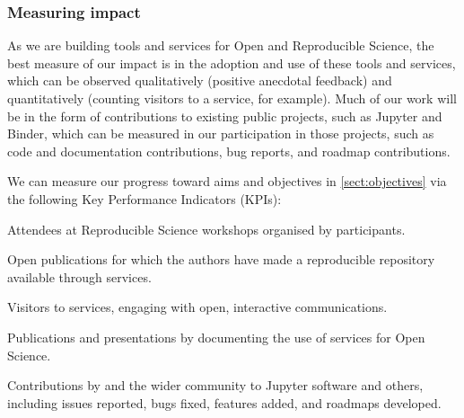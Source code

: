 \subsubsection{Measuring impact}

As we are building tools and services for Open and Reproducible Science,
the best measure of our impact is in the adoption and use of these tools and services,
which can be observed qualitatively (positive anecdotal feedback) and quantitatively
(counting visitors to a service, for example).
Much of our work will be in the form of contributions to existing public projects,
such as Jupyter and Binder,
which can be measured in our participation in those projects,
such as code and documentation contributions,
bug reports, and roadmap contributions.

We can measure our progress toward aims and objectives in \ref{sect:objectives}
via the following
Key Performance Indicators (KPIs):

\begin{compactenum}
  \item \label{kpi:workshop-attendees}
    Attendees at Reproducible Science workshops organised by \TheProject participants.
  \item \label{kpi:binder-publications}
    Open publications for which the authors have made a reproducible repository available
    through \TheProject services.
  \item \label{kpi:binder-visits}
    Visitors to \TheProject services, engaging with open, interactive
    communications.
  \item \label{kpi:dissemination}
    Publications and presentations by \TheProject documenting the use of \TheProject services for
    Open Science. 
  \item \label{kpi:contributions}
    Contributions by \TheProject and the wider community to Jupyter software and others,
    including issues reported, bugs fixed, features added, and roadmaps developed.
\end{compactenum}

